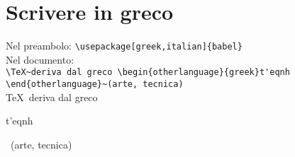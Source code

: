 \section{Scrivere in greco}
Nel preambolo: \verb!\usepackage[greek,italian]{babel}!\\
Nel documento: \\
\verb!\TeX~deriva dal greco \begin{otherlanguage}{greek}t'eqnh!\\
\verb!\end{otherlanguage}~(arte, tecnica)!\\
\TeX~deriva dal greco \begin{otherlanguage}{greek}t'eqnh\end{otherlanguage}~(arte, tecnica)